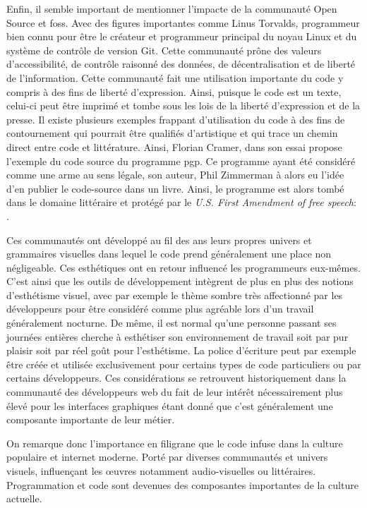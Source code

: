 \documentclass[12pt]{article} %
\begin{document}
Enfin, il semble important de mentionner l'impacte de la communauté Open Source et \acrshort{foss}. Avec des figures importantes comme Linus Torvalds, programmeur bien connu pour être le créateur et programmeur principal du noyau Linux et du système de contrôle de version Git. Cette communauté prône des valeurs d'accessibilité, de contrôle raisonné des données, de décentralisation et de liberté de l'information. Cette communauté fait une utilisation importante du code y compris à des fins de liberté d'expression. Ainsi, puisque le code est un texte, celui-ci peut être imprimé et tombe sous les lois de la liberté d'expression et de la presse. Il existe plusieurs exemples frappant d'utilisation du code à des fins de contournement qui pourrait être qualifiés d'artistique et qui trace un chemin direct entre code et littérature. Ainsi, Florian Cramer, dans son essai  propose l'exemple du code source du programme \acrshort{pgp}. Ce programme ayant été considéré comme une arme au sens légale, son auteur, Phil Zimmerman à alors eu l'idée d'en publier le code-source dans un livre. Ainsi, le programme est alors tombé dans le domaine littéraire et protégé par le \textit{U.S. First Amendment of free speech}:  \cite{FCramer2001}.

Ces communautés ont développé au fil des ans leurs propres univers et grammaires visuelles dans lequel le code prend généralement une place non négligeable. Ces esthétiques ont en retour influencé les programmeurs eux-mêmes. C'est ainsi que les outils de développement intègrent de plus en plus des notions d'esthétisme visuel, avec par exemple le thème sombre très affectionné par les développeurs pour être considéré comme plus agréable lors d'un travail généralement nocturne. De même, il est normal qu'une personne passant ses journées entières cherche à esthétiser son environnement de travail soit par pur plaisir soit par réel goût pour l'esthétisme. La police d'écriture peut par exemple être créée et utilisée exclusivement pour certains types de code particuliers ou par certains développeurs. Ces considérations se retrouvent historiquement dans la communauté des développeurs web du fait de leur intérêt nécessairement plus élevé pour les interfaces graphiques étant donné que c'est généralement une composante importante de leur métier. 

On remarque donc l'importance en filigrane que le code infuse dans la culture populaire et internet moderne. Porté par diverses communautés et univers visuels, influençant les œuvres notamment audio-visuelles ou littéraires. Programmation et code sont devenues des composantes importantes de la culture actuelle.  
\end{document}
